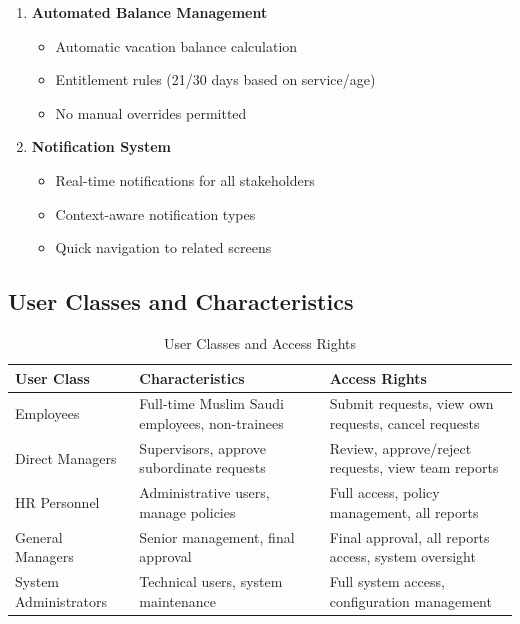 \documentclass[12pt,a4paper]{article}
\begin{document}
\begin{enumerate}
    \item \textbf{Automated Balance Management}
    \begin{itemize}
        \item Automatic vacation balance calculation
        \item Entitlement rules (21/30 days based on service/age)
        \item No manual overrides permitted
    \end{itemize}
    
    \item \textbf{Notification System}
    \begin{itemize}
        \item Real-time notifications for all stakeholders
        \item Context-aware notification types
        \item Quick navigation to related screens
    \end{itemize}
\end{enumerate}

\subsection{User Classes and Characteristics}
\begin{table}[H]
\centering
\begin{tabular}{|p{3cm}|p{4cm}|p{4cm}|}
\hline
\textbf{User Class} & \textbf{Characteristics} & \textbf{Access Rights} \\
\hline
Employees & Full-time Muslim Saudi employees, non-trainees & Submit requests, view own requests, cancel requests \\
\hline
Direct Managers & Supervisors, approve subordinate requests & Review, approve/reject requests, view team reports \\
\hline
HR Personnel & Administrative users, manage policies & Full access, policy management, all reports \\
\hline
General Managers & Senior management, final approval & Final approval, all reports access, system oversight \\
\hline
System Administrators & Technical users, system maintenance & Full system access, configuration management \\
\hline
\end{tabular}
\caption{User Classes and Access Rights}
\end{table}
\end{document}
